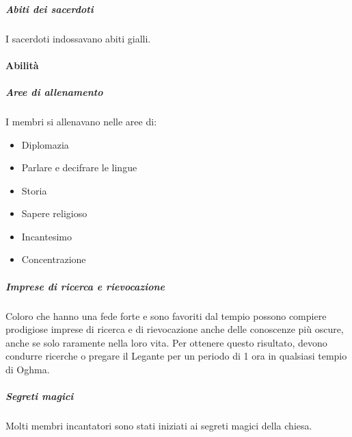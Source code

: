 \documentclass{article}
\begin{document}
                    \subparagraph{Abiti dei sacerdoti}
                    I sacerdoti indossavano abiti gialli.

                    \paragraph{Abilità}

                    \subparagraph{Aree di allenamento}
                    I membri si allenavano nelle aree di:
                    \begin{itemize}
                        \item Diplomazia
                        \item Parlare e decifrare le lingue
                        \item Storia
                        \item Sapere religioso
                        \item Incantesimo
                        \item Concentrazione
                    \end{itemize}

                    \subparagraph{Imprese di ricerca e rievocazione}
                    Coloro che hanno una fede forte e sono favoriti dal tempio possono compiere prodigiose imprese di ricerca e di rievocazione anche delle conoscenze più oscure, anche se solo raramente nella loro vita. Per ottenere questo risultato, devono condurre ricerche o pregare il Legante per un periodo di 1 ora in qualsiasi tempio di Oghma.

                    \subparagraph{Segreti magici}
                    Molti membri incantatori sono stati iniziati ai segreti magici della chiesa.
\end{document}
